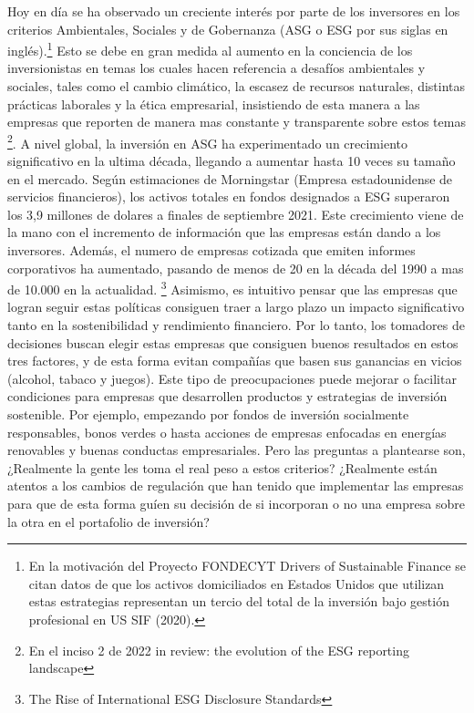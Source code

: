 Hoy en día se ha observado un creciente interés por parte de los inversores en los criterios Ambientales, Sociales y de Gobernanza (ASG o ESG por sus siglas en inglés).\footnote{En la motivación del Proyecto FONDECYT Drivers of Sustainable Finance se citan datos de que los activos domiciliados en Estados Unidos que utilizan estas estrategias representan un tercio del total de la inversión bajo gestión profesional en US SIF (2020).} Esto se debe en gran medida al aumento en la conciencia de los inversionistas en temas los cuales hacen referencia a desafíos ambientales y sociales, tales como el cambio climático, la escasez de recursos naturales, distintas prácticas laborales y la ética empresarial, insistiendo de esta manera a las empresas que reporten de manera mas constante y transparente sobre estos temas \footnote{En el inciso 2 de 2022 in review: the evolution of the ESG reporting landscape}. A nivel global, la inversión en ASG ha experimentado un crecimiento significativo en la ultima década, llegando a aumentar hasta 10 veces su tamaño en el mercado. Según estimaciones de Morningstar (Empresa estadounidense de servicios financieros), los activos totales en fondos designados a ESG superaron los 3,9 millones de dolares a finales de septiembre 2021. Este crecimiento viene de la mano con el incremento de información que las empresas están dando a los inversores. Además, el numero de empresas cotizada que emiten informes corporativos ha aumentado, pasando de menos de 20 en la década del 1990 a mas de 10.000 en la actualidad. \footnote{The Rise of International ESG Disclosure Standards} Asimismo, es intuitivo pensar que las empresas que logran seguir estas políticas consiguen traer a largo plazo un impacto significativo tanto en la sostenibilidad y rendimiento financiero. Por lo tanto, los tomadores de decisiones buscan elegir estas empresas que consiguen buenos resultados en estos tres factores, y de esta forma evitan compañías que basen sus ganancias en vicios (alcohol, tabaco y juegos). Este tipo de preocupaciones puede mejorar o facilitar condiciones para empresas que desarrollen productos y estrategias de inversión sostenible. Por ejemplo, empezando por fondos de inversión socialmente responsables, bonos verdes o hasta acciones de empresas enfocadas en energías renovables y buenas conductas empresariales. Pero las preguntas a plantearse son, ¿Realmente la gente les toma el real peso a estos criterios? ¿Realmente están atentos a los cambios de regulación que han tenido que implementar las empresas para que de esta forma guíen su decisión de si incorporan o no una empresa sobre la otra en el portafolio de inversión?
\\

